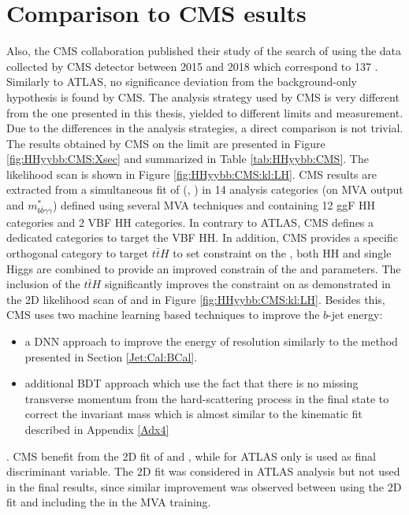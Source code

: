 \section{Comparison to CMS \texorpdfstring{\HHyybb} results}
\label{HHyybb:CMS}
Also, the CMS collaboration published their study of the search of \HHyybb using the data collected by CMS detector between 2015 and 2018 which correspond to 137 \ifb \cite{CMS_yybb}. Similarly to ATLAS, no significance deviation from the background-only hypothesis is found by CMS. The analysis strategy used by CMS is very different from the one presented in this thesis, yielded to different limits and \kl measurement. Due to the differences in the analysis strategies, a direct comparison is not trivial. The results obtained by CMS on the limit are presented in Figure \ref{fig:HHyybb:CMS:Xsec} and summarized in Table \ref{tab:HHyybb:CMS}. The \kl likelihood scan is shown in Figure \ref{fig:HHyybb:CMS:kl:LH}. CMS results are extracted from a simultaneous fit of (\myy , \mbb) in 14 analysis categories (on MVA output and $m_{b \bar{b} \gamma \gamma}^{*}$) defined using several MVA techniques and containing 12 ggF HH categories and 2 VBF HH categories. In contrary to ATLAS, CMS defines a dedicated categories to target the VBF HH. In addition, CMS provides a specific orthogonal category to target $t\bar{t}H$ to set constraint on the \kt, both HH and single Higgs are combined to provide an improved constrain of the \kl and \kt parameters. The inclusion of the $t\bar{t}H$ significantly improves the constraint on \kt as demonstrated in the 2D likelihood scan of \kl and \kt in Figure \ref{fig:HHyybb:CMS:kl:LH}. Besides this, CMS uses two machine learning based techniques to improve the $b$-jet energy:
\begin{itemize}
    \item a DNN approach to improve the energy of resolution similarly to the method presented in Section \ref{Jet:Cal:BCal}.
    \item additional BDT approach which use the fact that there is no missing transverse momentum from the hard-scattering process in the \HHyybb final state to correct the \mbb invariant mass which is almost similar to the kinematic fit described in Appendix \ref{Adx4}
\end{itemize}
. CMS benefit from the 2D fit of \myy and \mbb, while for ATLAS only \myy is used as final discriminant variable. The 2D fit was considered in ATLAS analysis but not used in the final results, since similar improvement was observed between using the 2D fit and including the \mbb in the MVA training.

